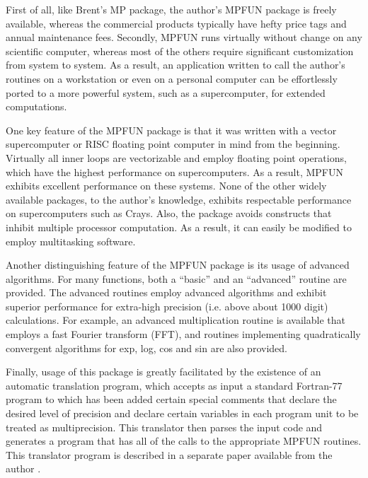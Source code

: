 First of all, like Brent's MP package, the author's MPFUN package is
freely available, whereas the commercial products typically have hefty
price tags and annual maintenance fees.  Secondly, MPFUN runs
virtually without change on any scientific computer, whereas most of
the others require significant customization from system to system.
As a result, an application written to call the author's routines on a
workstation or even on a personal computer can be effortlessly ported
to a more powerful system, such as a supercomputer, for extended
computations.

One key feature of the MPFUN package is that it was written with a
vector supercomputer or RISC floating point computer in mind from the
beginning.  Virtually all inner loops are vectorizable and employ
floating point operations, which have the highest performance on
supercomputers.  As a result, MPFUN exhibits excellent performance on
these systems.  None of the other widely available packages, to the
author's knowledge, exhibits respectable performance on supercomputers
such as Crays.  Also, the package avoids constructs that inhibit
multiple processor computation.  As a result, it can easily be
modified to employ multitasking software.

Another distinguishing feature of the MPFUN package is its usage of
advanced algorithms.  For many functions, both a ``basic'' and an
``advanced'' routine are provided.  The advanced routines employ
advanced algorithms and exhibit superior performance for extra-high
precision (i.e. above about 1000 digit) calculations.  For example, an
advanced multiplication routine is available that employs a fast
Fourier transform (FFT), and routines implementing quadratically
convergent algorithms for exp, log, cos and sin are also provided.

Finally, usage of this package is greatly facilitated by the existence
of an automatic translation program, which accepts as input a standard
Fortran-77 program to which has been added certain special comments
that declare the desired level of precision and declare certain
variables in each program unit to be treated as multiprecision.  This
translator then parses the input code and generates a program that has
all of the calls to the appropriate MPFUN routines.  This translator
program is described in a separate paper available from the author
\cite{dhb1}.

\vspace{2ex}

